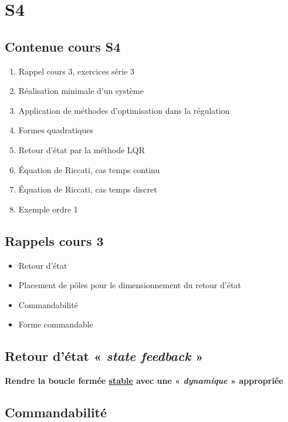 \documentclass[document.tex]{subfiles}
\begin{document}
\section{S4}

\subsection{Contenue cours S4}

\begin{enumerate}
\item Rappel cours 3, exercices série 3
\item Réalisation minimale d'un système
\item Application de méthodes d'optimisation dans la régulation 
\item Formes quadratiques
\item Retour d'état par la méthode LQR
\item Équation de Riccati, cas temps continu
\item Équation de Riccati, cas temps discret
\item Exemple ordre 1
\end{enumerate}

\subsection{Rappels cours 3}

\begin{itemize}
\item Retour d'état
\item Placement de pôles pour le dimensionnement du retour d'état
\item Commandabilité
\item Forme commandable
\end{itemize}

\subsection{Retour d'état  « \textit{state feedback} »}

\textbf{Rendre la boucle fermée \underline{stable} avec une « \textit{dynamique} » appropriée}


\subsection{Commandabilité}

\end{document}
